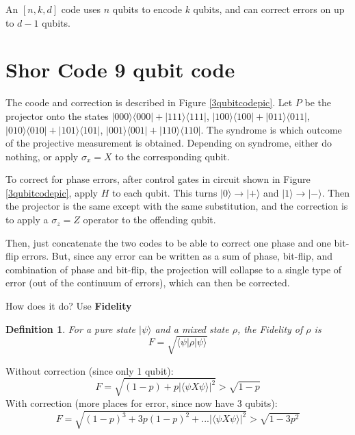 \documentclass[12pt]{article}
\newtheorem{define}[theorem]{Definition}
\begin{document}
An $[n,k,d]$ code uses $n$ qubits to encode $k$ qubits, and can correct errors on up to $d-1$ qubits.
\setcounter{section}{0}
\section{Shor Code 9 qubit code}
The coode and correction is described in Figure \ref{3qubitcodepic}. Let $P$ be the projector onto the states $|000\rangle\langle 000|+|111\rangle\langle 111|$, $|100\rangle\langle 100|+|011\rangle\langle 011|$,
 $|010\rangle\langle 010|+|101\rangle\langle 101|$, $|001\rangle\langle 001|+|110\rangle\langle 110|$. The syndrome is which outcome of the projective measurement is obtained. Depending on syndrome, either do nothing, or apply $\sigma_x=X$ to the corresponding qubit.


To correct for phase errors, after control gates in circuit shown in  Figure \ref{3qubitcodepic}, apply $H$ to each qubit. This turns $|0\rangle\rightarrow|+\rangle$ and $|1\rangle\rightarrow|-\rangle$. Then the projector is the same except with the same substitution, and the correction is to apply a $\sigma_z=Z$ operator to the offending qubit.

Then, just concatenate the two codes to be able to correct one phase and one bit-flip errors. But, since any error can be written as a sum of phase, bit-flip, and combination of phase and bit-flip, the projection will collapse to a single type of error (out of the continuum of errors), which can then be corrected.

How does it do? Use {\bf{Fidelity}}

\begin{define}
For a pure state $|\psi\rangle$ and a mixed state $\rho$, the Fidelity of $\rho$ is 
\begin{equation}
F=\sqrt{\langle\psi|\rho|\psi\rangle}
\end{equation}
\end{define}

Without correction (since only 1 qubit): $$F=\sqrt{(1-p)+p|\langle\psi X\psi\rangle|^2}>\sqrt{1-p}$$
With correction (more places for error, since now have 3 qubits): $$F=\sqrt{(1-p)^3+3p(1-p)^2+...|\langle\psi X\psi\rangle|^2}>\sqrt{1-3p^2}$$
\end{document}
